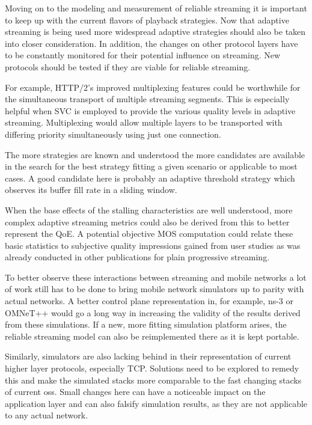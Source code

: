 Moving on to the modeling and measurement of reliable streaming it is important to keep up with the current flavors of playback strategies. Now that adaptive streaming is being used more widespread adaptive strategies should also be taken into closer consideration. In addition, the changes on other protocol layers have to be constantly monitored for their potential influence on streaming. New protocols should be tested if they are viable for reliable streaming. 

For example, \gls{HTTP}/2's improved multiplexing features could be worthwhile for the simultaneous transport of multiple streaming segments. This is especially helpful when \gls{SVC} is employed to provide the various quality levels in adaptive streaming. Multiplexing would allow multiple layers to be transported with differing priority simultaneously using just one connection.

The more strategies are known and understood the more candidates are available in the search for the best strategy fitting a given scenario or applicable to most cases. A good candidate here is probably an adaptive threshold strategy which observes its buffer fill rate in a sliding window.

When the base effects of the stalling characteristics are well understood, more complex adaptive streaming metrics could also be derived from this to better represent the \gls{QoE}. A potential objective \gls{MOS} computation could relate these basic statistics to subjective quality impressions gained from user studies as was already conducted in other publications for plain progressive streaming.


To better observe these interactions between streaming and mobile networks a lot of work still has to be done to bring mobile network simulators up to parity with actual networks. A better control plane representation in, for example, ns-3 or OMNeT++ would go a long way in increasing the validity of the results derived from these simulations. If a new, more fitting simulation platform arises, the reliable streaming model can also be reimplemented there as it is kept portable.

Similarly, simulators are also lacking behind in their representation of current higher layer protocols, especially \gls{TCP}. Solutions need to be explored to remedy this and make the simulated stacks more comparable to the fast changing stacks of current \glspl{os}. Small changes here can have a noticeable impact on the application layer and can also falsify simulation results, as they are not applicable to any actual network.

